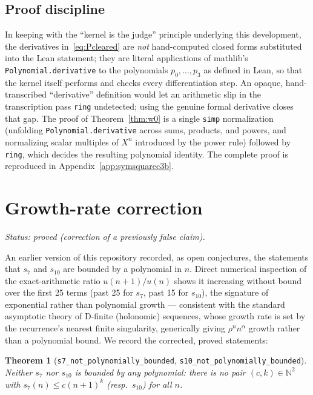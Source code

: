 \documentclass[11pt]{article}
\newtheorem{theorem}{Theorem}[section]
\begin{document}
\subsection{Proof discipline}

In keeping with the ``kernel is the judge'' principle underlying this
development, the derivatives in~\eqref{eq:Pcleared} are \emph{not}
hand-computed closed forms substituted into the Lean statement; they are
literal applications of mathlib's \lstinline{Polynomial.derivative} to the
polynomials $p_0,\dots,p_3$ as defined in Lean, so that the kernel itself
performs and checks every differentiation step. An opaque, hand-transcribed
``derivative'' definition would let an arithmetic slip in the transcription
pass \texttt{ring} undetected; using the genuine formal derivative closes
that gap. The proof of Theorem~\ref{thm:w0} is a single \texttt{simp}
normalization (unfolding \lstinline{Polynomial.derivative} across sums,
products, and powers, and normalizing scalar multiples of \(X^n\) introduced
by the power rule) followed by \texttt{ring}, which decides the resulting
polynomial identity. The complete proof is reproduced in
Appendix~\ref{app:symsquarec3b}.

\section{Growth-rate correction}
\label{sec:growth}

\emph{Status: proved (correction of a previously false claim).}

An earlier version of this repository recorded, as open conjectures, the
statements that $s_7$ and $s_{10}$ are bounded by a polynomial in $n$. Direct
numerical inspection of the exact-arithmetic ratio $u(n{+}1)/u(n)$ shows it
increasing without bound over the first 25 terms (past 25 for $s_7$, past 15
for $s_{10}$), the signature of exponential rather than polynomial growth ---
consistent with the standard asymptotic theory of D-finite (holonomic)
sequences, whose growth rate is set by the recurrence's nearest finite
singularity, generically giving $\rho^n n^\alpha$ growth rather than a
polynomial bound. We record the corrected, proved statements:

\begin{theorem}[\lstinline{s7_not_polynomially_bounded}, \lstinline{s10_not_polynomially_bounded}]
Neither $s_7$ nor $s_{10}$ is bounded by any polynomial: there is no pair
$(c,k)\in\mathbb{N}^2$ with $s_7(n)\le c(n+1)^k$ (resp.\ $s_{10}$) for all $n$.
\end{theorem}
\end{document}
